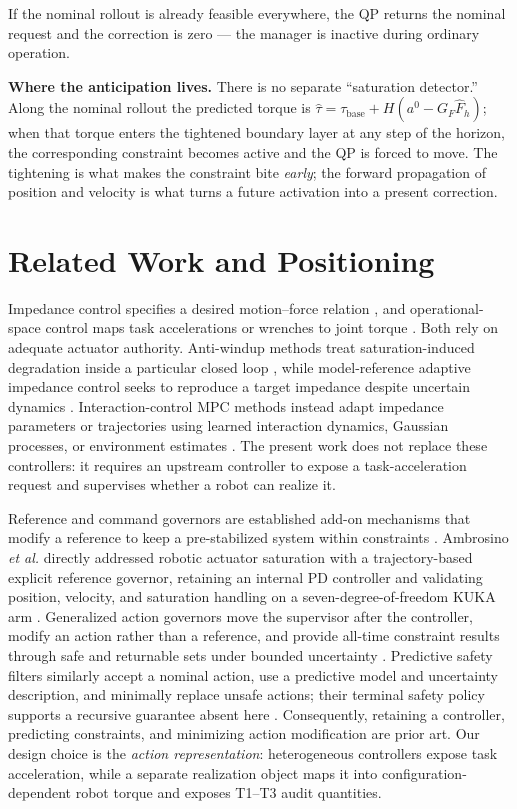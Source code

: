 \documentclass[journal]{IEEEtran}
\begin{document}
If the nominal rollout is already feasible everywhere, the QP returns the nominal request and the correction is zero --- the manager is inactive during ordinary operation.

\textbf{Where the anticipation lives.} There is no separate ``saturation detector.'' Along the nominal rollout the predicted torque is $\hat\tau=\tau_{\mathrm{base}}+H(a^{0}-G_F\hat F_h)$; when that torque enters the tightened boundary layer at any step of the horizon, the corresponding constraint becomes active and the QP is forced to move. The tightening is what makes the constraint bite \emph{early}; the forward propagation of position and velocity is what turns a future activation into a present correction.

\section{Related Work and Positioning}
\label{sec:related}

Impedance control specifies a desired motion--force relation \cite{r1}, and operational-space control maps task accelerations or wrenches to joint torque \cite{r2}. Both rely on adequate actuator authority. Anti-windup methods treat saturation-induced degradation inside a particular closed loop \cite{r6,r7}, while model-reference adaptive impedance control seeks to reproduce a target impedance despite uncertain dynamics \cite{r11}. Interaction-control MPC methods instead adapt impedance parameters or trajectories using learned interaction dynamics, Gaussian processes, or environment estimates \cite{r12,r13,r14,r15}. The present work does not replace these controllers: it requires an upstream controller to expose a task-acceleration request and supervises whether a robot can realize it.

Reference and command governors are established add-on mechanisms that modify a reference to keep a pre-stabilized system 
within constraints \cite{r3}. Ambrosino \emph{et al.} directly addressed robotic actuator saturation with a trajectory-based explicit reference governor, retaining an internal PD controller and validating position, velocity, and saturation handling on a seven-degree-of-freedom KUKA arm \cite{r17}. Generalized action governors move the supervisor after the controller, modify an action rather than a reference, and provide all-time constraint results through safe and returnable sets under bounded uncertainty \cite{r18}. Predictive safety filters similarly accept a nominal action, use a predictive model and uncertainty description, and minimally replace unsafe actions; their terminal safety policy supports a recursive guarantee absent here \cite{r5,r16}. 
Consequently, retaining a controller, predicting constraints, and minimizing action modification are prior art. 
Our design choice is the \emph{action representation}: heterogeneous controllers expose task acceleration, 
while a separate realization object maps it into configuration-dependent robot torque and exposes T1--T3 audit quantities.
\end{document}
